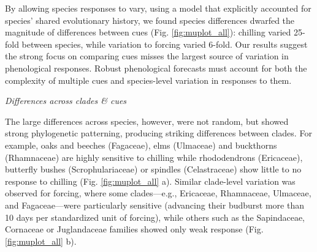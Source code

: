 \documentclass{article}\usepackage[]{graphicx}\usepackage[]{color}
\begin{document}
By allowing species responses to vary, using a model that explicitly accounted for species' shared evolutionary history, we found species differences dwarfed the magnitude of differences between cues (Fig. \ref{fig:muplot_all}): chilling varied 25-fold between species, while variation to forcing varied 6-fold. Our results suggest the strong focus on comparing cues misses the largest source of variation in phenological responses. Robust phenological forecasts must account for both the complexity of multiple cues and species-level variation in responses to them.

\emph{Differences across clades \& cues}

The large differences across species, however, were not random, but showed strong phylogenetic patterning, producing striking differences between clades. For example, oaks and beeches (Fagaceae), elms (Ulmaceae) and buckthorns (Rhamnaceae) are highly sensitive to chilling while rhododendrons (Ericaceae), butterfly bushes (Scrophulariaceae) or spindles (Celastraceae) show little to no response to chilling (Fig. \ref{fig:muplot_all} a). %
Similar clade-level variation was observed for forcing, where some clades---e.g., Ericaceae, Rhamnaceae, Ulmaceae, and Fagaceae---were particularly sensitive (advancing their budburst more than 10 days per standardized unit of forcing), while  others such as the Sapindaceae, Cornaceae or Juglandaceae families showed only weak response (Fig. \ref{fig:muplot_all} b). %
\end{document}
